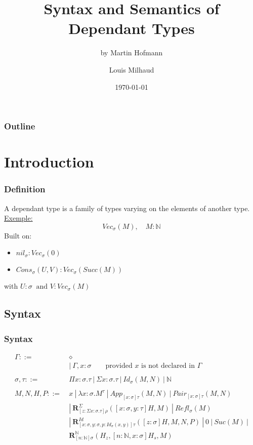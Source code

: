 \documentclass[aspectratio=169]{beamer}
\title{Syntax and Semantics of Dependant Types}
\subtitle{by Martin Hofmann}
\author{Louis Milhaud}
\institute{Université Paris Saclay}
\date{\today}
\newcommand{\N}{\mathbb{N}}
\newcommand{\app}[2]{App_{[x:\sigma]\tau}(#1, #2)}
\newcommand{\pair}[2]{Pair_{[x:\sigma]\tau}(#1, #2)}
\newcommand{\R}[2]{\mathbold{R}_{[z:\Sigma x:\sigma.\tau]\rho}^{\Sigma}(#1, #2)}
\newcommand{\RN}[3]{\mathbold{R}_{[n: \N]\sigma}^{\N}(#1, #2, #3)}
\newcommand{\Id}[2]{Id_\sigma(#1,#2)}
\newcommand{\Refl}[1]{Refl_\sigma(#1)}
\newcommand{\RID}[4]{\mathbold{R}_{[x:\sigma,y:\sigma,p:Id_\sigma(x,y)]\tau}^{Id}(#1, #2, #3, #4)}
\begin{document}
    \begin{frame}
        \titlepage
    \end{frame}

    \begin{frame}
        \frametitle{Outline}
        \tableofcontents
    \end{frame}

    \section{Introduction}
    \begin{frame}
        \frametitle{Definition}
        A dependant type is a family of types varying on the elements of another type.\\
        \vspace{20pt}
        \underline{Exemple:}\\
        $$Vec_\sigma(M),\quad M:\N $$
        Built on:
        \begin{itemize}
            \item $nil_\sigma : Vec_\sigma(0)$
            \item $Cons_\sigma(U, V) : Vec_\sigma(Succ(M))$ 
        \end{itemize}
        with $ U : \sigma\ \text{ and } V : Vec_\sigma(M)$
    \end{frame}

    \subsection{Syntax}
    \begin{frame}
        \frametitle{Syntax}
        \begin{align*}
            \Gamma ::=\ &\diamond\\
                &|\ \Gamma,x:\sigma \qquad\text{provided $x$ is not declared in $\Gamma$}\\
                &\text{}\\
            \sigma,\tau ::=\ &\Pi x:\sigma.\tau\ |\ \Sigma x:\sigma.\tau\ |\ \Id{M}{N}\ |\ \N\\
            &\text{}\\
            M,N,H,P ::=\ &x\ |\ \lambda x:\sigma.M^\tau\ |\ \app{M}{N}\ |\ \pair{M}{N}\\
                &|\ \R{[x:\sigma,y:\tau]H}{M}\ |\ \Refl{M}\\
                &|\ \RID{[z:\sigma]H}{M}{N}{P}\ |\ 0\ |\ Suc(M)\ |\\
                &\RN{H_z}{[n:\N,x:\sigma]H_s}{M}
        \end{align*}
    \end{frame}
\end{document}
